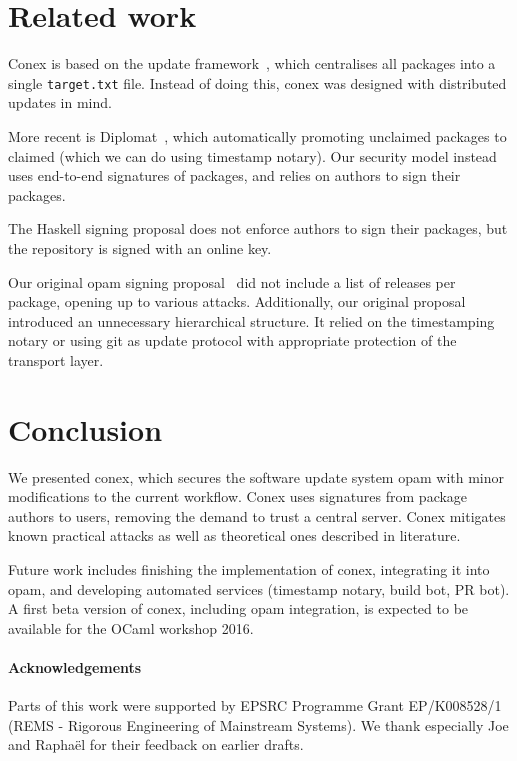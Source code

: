 \documentclass[nocopyrightspace]{sigplanconf}
\begin{document}
\section{Related work} \label{sec:related}
Conex is based on the update framework~\cite{tuf}, which centralises all packages into a single \texttt{target.txt} file.
Instead of doing this, conex was designed with distributed updates in mind.

More recent is Diplomat~\cite{diplomat}, which automatically promoting unclaimed packages to claimed (which we can do using timestamp notary).
Our security model instead uses end-to-end signatures of packages, and relies on authors to sign their packages.

The Haskell signing proposal does not enforce authors to sign their packages, but the repository is signed with an online key.

Our original opam signing proposal~\cite{opamsigning} did not include a list of releases per package, opening up to various attacks.
Additionally, our original proposal introduced an unnecessary hierarchical structure.
It relied on the timestamping notary or using git as update protocol with appropriate protection of the transport layer.


\section{Conclusion} \label{sec:conclusion}
We presented conex, which secures the software update system opam with minor modifications to the current workflow.
Conex uses signatures from package authors to users, removing the demand to trust a central server.
Conex mitigates known practical attacks as well as theoretical ones described in literature.

Future work includes finishing the implementation of conex, integrating it into opam, and developing automated services (timestamp notary, build bot, PR bot).
A first beta version of conex, including opam integration, is expected to be available for the OCaml workshop 2016.

\paragraph{Acknowledgements} Parts of this work were supported by EPSRC Programme Grant EP/K008528/1 (REMS - Rigorous Engineering of Mainstream Systems).  We thank especially Joe and Rapha\"el for their feedback on earlier drafts.



\end{document}
